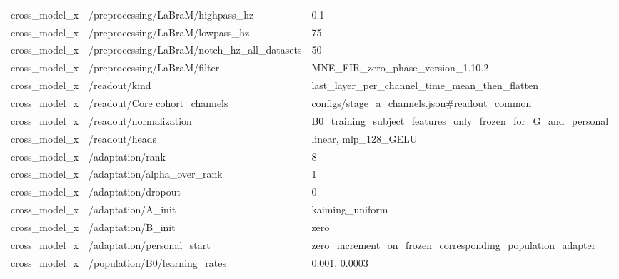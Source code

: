 \begin{longtable}{p{.65in}p{2.8in}p{3.2in}}
cross\_\allowbreak{}model\_\allowbreak{}x & /preprocessing/LaBraM/highpass\_\allowbreak{}hz & 0.1 \\
cross\_\allowbreak{}model\_\allowbreak{}x & /preprocessing/LaBraM/lowpass\_\allowbreak{}hz & 75 \\
cross\_\allowbreak{}model\_\allowbreak{}x & /preprocessing/LaBraM/notch\_\allowbreak{}hz\_\allowbreak{}all\_\allowbreak{}datasets & 50 \\
cross\_\allowbreak{}model\_\allowbreak{}x & /preprocessing/LaBraM/filter & MNE\_\allowbreak{}FIR\_\allowbreak{}zero\_\allowbreak{}phase\_\allowbreak{}version\_\allowbreak{}1.10.2 \\
cross\_\allowbreak{}model\_\allowbreak{}x & /readout/kind & last\_\allowbreak{}layer\_\allowbreak{}per\_\allowbreak{}channel\_\allowbreak{}time\_\allowbreak{}mean\_\allowbreak{}then\_\allowbreak{}flatten \\
cross\_\allowbreak{}model\_\allowbreak{}x & /readout/Core cohort\_\allowbreak{}channels & configs/stage\_\allowbreak{}a\_\allowbreak{}channels.json\#readout\_\allowbreak{}common \\
cross\_\allowbreak{}model\_\allowbreak{}x & /readout/normalization & B0\_\allowbreak{}training\_\allowbreak{}subject\_\allowbreak{}features\_\allowbreak{}only\_\allowbreak{}frozen\_\allowbreak{}for\_\allowbreak{}G\_\allowbreak{}and\_\allowbreak{}personal \\
cross\_\allowbreak{}model\_\allowbreak{}x & /readout/heads & linear, mlp\_\allowbreak{}128\_\allowbreak{}GELU \\
cross\_\allowbreak{}model\_\allowbreak{}x & /adaptation/rank & 8 \\
cross\_\allowbreak{}model\_\allowbreak{}x & /adaptation/alpha\_\allowbreak{}over\_\allowbreak{}rank & 1 \\
cross\_\allowbreak{}model\_\allowbreak{}x & /adaptation/dropout & 0 \\
cross\_\allowbreak{}model\_\allowbreak{}x & /adaptation/A\_\allowbreak{}init & kaiming\_\allowbreak{}uniform \\
cross\_\allowbreak{}model\_\allowbreak{}x & /adaptation/B\_\allowbreak{}init & zero \\
cross\_\allowbreak{}model\_\allowbreak{}x & /adaptation/personal\_\allowbreak{}start & zero\_\allowbreak{}increment\_\allowbreak{}on\_\allowbreak{}frozen\_\allowbreak{}corresponding\_\allowbreak{}population\_\allowbreak{}adapter \\
cross\_\allowbreak{}model\_\allowbreak{}x & /population/B0/learning\_\allowbreak{}rates & 0.001, 0.0003 \\

\end{longtable}
